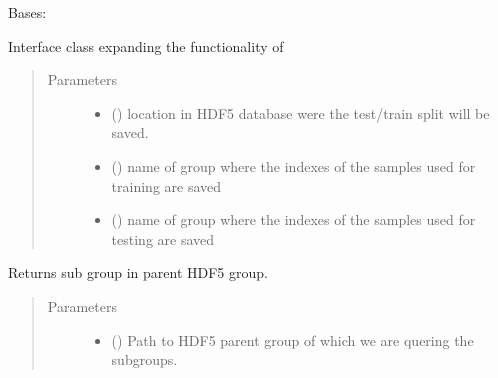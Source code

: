 \documentclass[letterpaper,10pt,english]{sphinxmanual}
\begin{document}
\begin{fulllineitems}
\label{\detokenize{data:mleap.data.data.Data}}
Bases: 

Interface class expanding the functionality of {\hyperref[\detokenize{shared:mleap.shared.files_io.FilesIO}]{}}
\begin{quote}\begin{description}
\item[{Parameters}] \leavevmode\begin{itemize}
\item {} 
 () \textendash{} location in HDF5 database were the test/train split will be saved.

\item {} 
 () \textendash{} name of group where the indexes of the samples used for training are saved

\item {} 
 () \textendash{} name of group where the indexes of the samples used for testing are saved

\end{itemize}

\end{description}\end{quote}

\begin{fulllineitems}
\label{\detokenize{data:mleap.data.data.Data.list_datasets}}
Returns sub group in parent HDF5 group.
\begin{quote}\begin{description}
\item[{Parameters}] \leavevmode\begin{itemize}
\item {} 
 () \textendash{} Path to HDF5 parent group of which we are quering the subgroups.


\end{itemize}
\end{description}
\end{quote}
\end{fulllineitems}
\end{fulllineitems}
\end{document}
